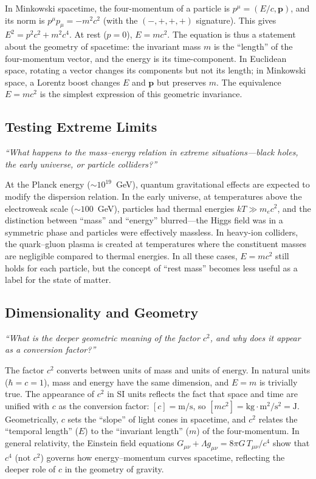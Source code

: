 In Minkowski spacetime, the four-momentum of a particle is $p^{\mu} = (E/c, \mathbf{p})$, and its norm is $p^{\mu}p_{\mu} = -m^{2}c^{2}$ (with the $(-,+,+,+)$ signature). This gives $E^{2} = p^{2}c^{2} + m^{2}c^{4}$. At rest ($p = 0$), $E = mc^{2}$. The equation is thus a statement about the geometry of spacetime: the invariant mass $m$ is the ``length'' of the four-momentum vector, and the energy is its time-component. In Euclidean space, rotating a vector changes its components but not its length; in Minkowski space, a Lorentz boost changes $E$ and $\mathbf{p}$ but preserves $m$. The equivalence $E = mc^{2}$ is the simplest expression of this geometric invariance.

\subsection*{Testing Extreme Limits}
\textit{``What happens to the mass--energy relation in extreme situations---black holes, the early universe, or particle colliders?''}

At the Planck energy ($\sim 10^{19}$~GeV), quantum gravitational effects are expected to modify the dispersion relation. In the early universe, at temperatures above the electroweak scale ($\sim 100$~GeV), particles had thermal energies $kT \gg m_{e}c^{2}$, and the distinction between ``mass'' and ``energy'' blurred---the Higgs field was in a symmetric phase and particles were effectively massless. In heavy-ion colliders, the quark--gluon plasma is created at temperatures where the constituent masses are negligible compared to thermal energies. In all these cases, $E = mc^{2}$ still holds for each particle, but the concept of ``rest mass'' becomes less useful as a label for the state of matter.

\subsection*{Dimensionality and Geometry}
\textit{``What is the deeper geometric meaning of the factor $c^{2}$, and why does it appear as a conversion factor?''}

The factor $c^{2}$ converts between units of mass and units of energy. In natural units ($\hbar = c = 1$), mass and energy have the same dimension, and $E = m$ is trivially true. The appearance of $c^{2}$ in SI units reflects the fact that space and time are unified with $c$ as the conversion factor: $[c] = \text{m/s}$, so $[mc^{2}] = \text{kg} \cdot \text{m}^{2}/\text{s}^{2} = \text{J}$. Geometrically, $c$ sets the ``slope'' of light cones in spacetime, and $c^{2}$ relates the ``temporal length'' ($E$) to the ``invariant length'' ($m$) of the four-momentum. In general relativity, the Einstein field equations $G_{\mu\nu} + \Lambda g_{\mu\nu} = 8\pi G\,T_{\mu\nu}/c^{4}$ show that $c^{4}$ (not $c^{2}$) governs how energy--momentum curves spacetime, reflecting the deeper role of $c$ in the geometry of gravity.

